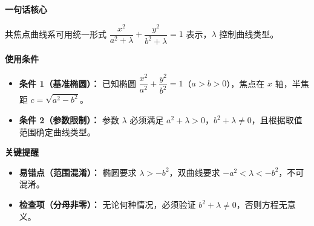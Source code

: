 \begin{summarybox}

	\textbf{\textcolor{CSummary}{一句话核心}}

	共焦点曲线系可用统一形式 $\dfrac{x^2}{a^2+\lambda}+\dfrac{y^2}{b^2+\lambda}=1$ 表示，$\lambda$ 控制曲线类型。

	\medskip
	\textbf{\textcolor{CSummary}{使用条件}}
	\begin{itemize}[leftmargin=*, itemsep=0.5em, topsep=0.4em]
		\item \textbf{条件 1（基准椭圆）：} 已知椭圆 $\dfrac{x^2}{a^2}+\dfrac{y^2}{b^2}=1$（$a>b>0$），焦点在 $x$ 轴，半焦距 $c=\sqrt{a^2-b^2}$。
		\item \textbf{条件 2（参数限制）：} 参数 $\lambda$ 必须满足 $a^2+\lambda>0$，$b^2+\lambda\neq0$，且根据取值范围确定曲线类型。
	\end{itemize}

	\medskip
	\textbf{\textcolor{CSummary}{关键提醒}}
	\begin{itemize}[leftmargin=*, itemsep=0.5em, topsep=0.4em]
		\item \textbf{易错点（范围混淆）：} 椭圆要求 $\lambda>-b^2$，双曲线要求 $-a^2<\lambda<-b^2$，不可混淆。
		\item \textbf{检查项（分母非零）：} 无论何种情况，必须验证 $b^2+\lambda\neq0$，否则方程无意义。
	\end{itemize}
\end{summarybox}
